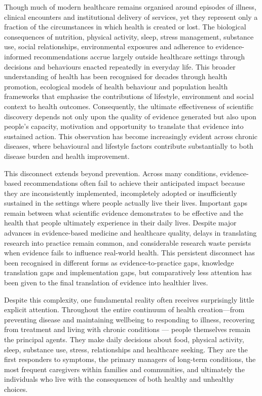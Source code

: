 \documentclass{article}
\begin{document}
Though much of modern healthcare remains organised around episodes of illness, clinical encounters and institutional delivery of services, yet they represent only a fraction of the circumstances in which health is created or lost. The biological consequences of nutrition, physical activity, sleep, stress management, substance use, social relationships, environmental exposures and adherence to evidence-informed recommendations accrue largely outside healthcare settings through decisions and behaviours enacted repeatedly in everyday life. This broader understanding of health has been recognised for decades through health promotion, ecological models of health behaviour and population health frameworks that emphasise the contributions of lifestyle, environment and social context to health outcomes. Consequently, the ultimate effectiveness of scientific discovery depends not only upon the quality of evidence generated but also upon people's capacity, motivation and opportunity to translate that evidence into sustained action. This observation has become increasingly evident across chronic diseases, where behavioural and lifestyle factors contribute substantially to both disease burden and health improvement. 

This disconnect extends beyond prevention. Across many conditions, evidence-based recommendations often fail to achieve their anticipated impact because they are inconsistently implemented, incompletely adopted or insufficiently sustained in the settings where people actually live their lives. Important gaps remain between what scientific evidence demonstrates to be effective and the health that people ultimately experience in their daily lives. \cite{Sackett1996} \cite{Eccles2006} \cite{IOM2013}  Despite major advances in evidence-based medicine and healthcare quality, delays in translating research into practice remain common, and considerable research waste persists when evidence fails to influence real-world health. \cite{WHO2025} \cite{GBD2024}  \cite{WHOGlobalStatusReportNCD}  \cite{WHO2015} \cite{Katz2009} \cite{Egger2017} This persistent disconnect has been recognised in different forms as evidence-to-practice gaps, knowledge translation gaps and implementation gaps, but comparatively less attention has been given to the final translation of evidence into healthier lives. \cite{Greenhalgh2011} \cite{Grimshaw2012} \cite{Straus2013} \cite{Morris2011} 

Despite this complexity, one fundamental reality often receives surprisingly little explicit attention. Throughout the entire continuum of health creation—from preventing disease and maintaining wellbeing to responding to illness, recovering from treatment and living with chronic conditions — people themselves remain the principal agents. They make daily decisions about food, physical activity, sleep, substance use, stress, relationships and healthcare seeking. They are the first responders to symptoms, the primary managers of long-term conditions, the most frequent caregivers within families and communities, and ultimately the individuals who live with the consequences of both healthy and unhealthy choices.
\end{document}
